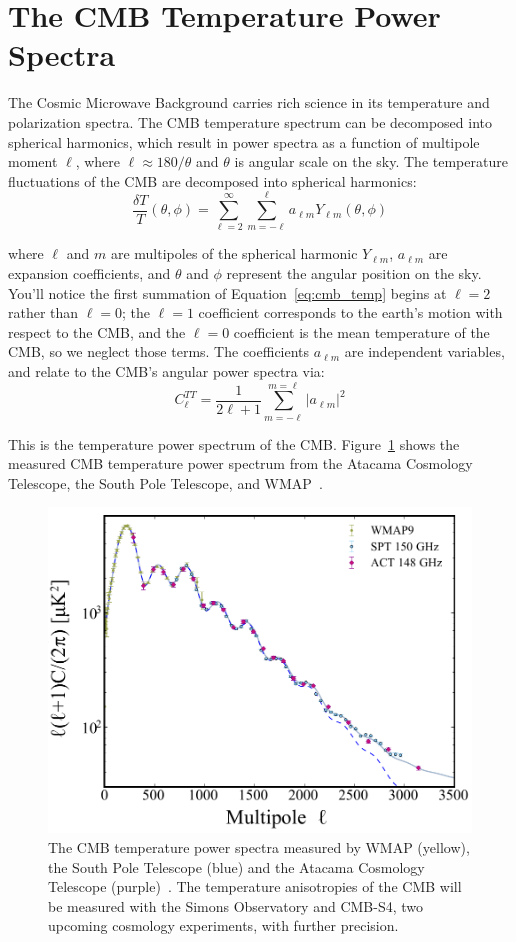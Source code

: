\section{The CMB Temperature Power Spectra}
The Cosmic Microwave Background carries rich science in its temperature and polarization spectra.  The CMB temperature spectrum can be decomposed into spherical harmonics, which result in power spectra as a function of multipole moment $\ell$, where $\ell\approx180/\theta$ and $\theta$ is angular scale on the sky.  The temperature fluctuations of the CMB are decomposed into spherical harmonics:
\begin{equation}
\frac{\delta T}{T}(\theta,\phi) = \sum_{\ell=2}^{\infty} \sum_{m=-\ell}^{\ell} a_{\ell m} Y_{\ell m}(\theta,\phi)
    \label{eq:cmb_temp}
\end{equation}

where $\ell$ and $m$ are multipoles of the spherical harmonic $Y_{\ell m}$, $a_{\ell m}$ are expansion coefficients, and $\theta$ and $\phi$ represent the angular position on the sky.  You'll notice the first summation of Equation~\ref{eq:cmb_temp} begins at $\ell=2$ rather than $\ell=0$; the $\ell=1$ coefficient corresponds to the earth's motion with respect to the CMB, and the $\ell=0$ coefficient is the mean temperature of the CMB, so we neglect those terms.  The coefficients $a_{\ell m}$ are independent variables, and relate to the CMB's angular power spectra via:
\begin{equation}
    C_\ell^{TT} = \frac{1}{2\ell +1} \sum_{m=-\ell}^{m=\ell} |a_{\ell m}|^2
\end{equation}

This is the temperature power spectrum of the CMB.  Figure~\ref{fig:measured_cmb_spec} shows the measured CMB temperature power spectrum from the Atacama Cosmology Telescope, the South Pole Telescope, and WMAP~\cite{Das_2014}.
\begin{figure}[t]
    \centering
    \includegraphics[width = .8\textwidth]{Figures/temp_power_spectrum.pdf}
    \caption{The CMB temperature power spectra measured by WMAP (yellow), the South Pole Telescope (blue) and the Atacama Cosmology Telescope (purple)~\cite{Das_2014}.  The temperature anisotropies of the CMB will be measured with the Simons Observatory and CMB-S4, two upcoming cosmology experiments, with further precision.}
    \label{fig:measured_cmb_spec}
\end{figure}

